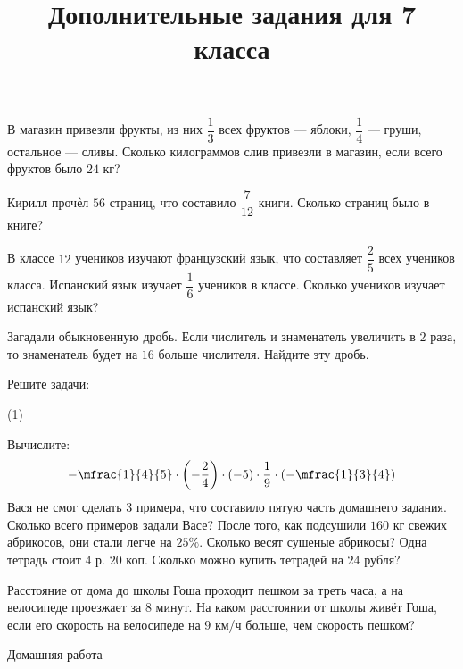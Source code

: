 \begin{class}[number=1]
\begin{listofex}
		\item В магазин привезли фрукты, из них \( \dfrac{1}{3} \) всех фруктов --- яблоки, \( \dfrac{1}{4} \) --- груши, остальное --- сливы. Сколько килограммов слив привезли в магазин, если всего фруктов было \( 24 \) кг?
		\item Кирилл прочѐл \( 56 \) страниц, что составило \( \dfrac{7}{12} \) книги. Сколько страниц было в книге?
		\item В классе \( 12 \) учеников изучают французский язык, что составляет \( \dfrac{2}{5} \) всех учеников класса. Испанский язык изучает \( \dfrac{1}{6} \) учеников в классе. Сколько учеников изучает испанский язык?
		\item Загадали обыкновенную дробь. Если числитель и знаменатель увеличить в \( 2 \) раза, то знаменатель будет на \( 16 \) больше числителя. Найдите эту дробь.
	\end{listofex}
	\title{Дополнительные задания для 7 класса}
	\begin{listofex}
		\item Решите задачи:
		\begin{tasks}(1)
			\item Вычислите: 
			\[-\mfrac{1}{4}{5}\cdot\left( -\dfrac{2}{4} \right)\cdot(-5)\cdot\dfrac{1}{9}\cdot\left( -\mfrac{1}{3}{4} \right)\]
			\task  Вася не смог сделать \( 3 \) примера, что составило пятую часть домашнего задания. Сколько всего примеров задали Васе?
			\task После того, как подсушили \( 160 \) кг свежих абрикосов, они стали легче на \( 25\% \). Сколько весят сушеные абрикосы?
			\task Одна тетрадь стоит \( 4 \) р. \( 20 \) коп. Сколько можно купить тетрадей на \( 24 \) рубля?
		\end{tasks}
		\item Расстояние от дома до школы Гоша проходит пешком за треть часа, а на велосипеде проезжает за \( 8 \) минут. На каком расстоянии от школы живёт Гоша, если его скорость на велосипеде на \( 9 \) км/ч больше, чем скорость пешком?
	\end{listofex}
\end{class}

\begin{homework}[number=1]
		\begin{listofex}
			\item Домашняя работа
		\end{listofex}
\end{homework}

